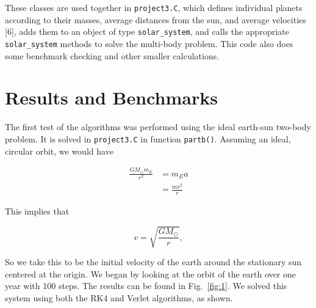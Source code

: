 \documentclass[12pt]{article}
\numberwithin{equation}{section}
\begin{document}
\par These classes are used together in \texttt{project3.C}, which defines individual planets according to their masses, average distances from the sun, and average velocities [6], adds them to an object of type \texttt{solar\_system}, and calls the appropriate \texttt{solar\_system} methods to solve the multi-body problem.  This code also does some benchmark checking and other smaller calculations.

\section{Results and Benchmarks}
\label{sec:results}

The first test of the algorithms was performed using the ideal earth-sun two-body problem.  It is solved in \texttt{project3.C} in function \texttt{partb()}.  Assuming an ideal, circular orbit, we would have

\begin{align*}
\frac{GM_{\odot}m_{E}}{r^{2}} & = m_{E}a \\
& = \frac{mv^{2}}{r}
\end{align*}

\noindent This implies that

\begin{equation}
v = \sqrt{\frac{GM_{\odot}}{r}},
\end{equation}

\noindent So we take this to be the initial velocity of the earth around the stationary sun centered at the origin.  We began by looking at the orbit of the earth over one year with 100 steps.  The results can be found in Fig.~\ref{fig:1}.  We solved this system using both the RK4 and Verlet algorithms, as shown.  
\end{document}
